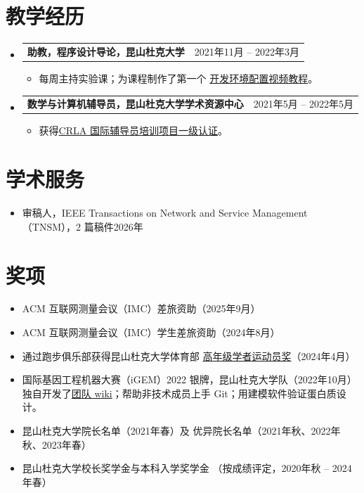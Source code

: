 \documentclass[letterpaper,11pt]{article}
\makeatletter
\newcommand{\CVItem}[1]{
  \item{\small
    {#1}
  }
}
\newcommand{\CVSubheadingFrame}[1]{
  \item
    \begin{tabular*}{0.97\textwidth}[t]{l@{\extracolsep{\fill}}r}
        #1
    \end{tabular*}
}
\newcommand{\CVSubHeadingListStart}{\begin{itemize}[leftmargin=1.2em, label={}]}
\newcommand{\CVSubHeadingListEnd}{\end{itemize}}
\newcommand{\CVItemListStart}{\begin{itemize}}
\newcommand{\CVItemListEnd}{\end{itemize}}
\newcommand{\uhref}[2]{\href{#1}{\textcolor{darkbluepurple}{#2}}}
\makeatother
\begin{document}
\section{教学经历}
\CVSubHeadingListStart
\CVSubheadingFrame
{\textbf{助教，程序设计导论，昆山杜克大学}&
    2021年11月 -- 2022年3月
}
\CVItemListStart
\CVItem
{每周主持实验课；为课程制作了第一个
    \uhref{https://www.youtube.com/watch?v=yiL-ULPBkvE}{开发环境配置视频教程}。
}
\CVItemListEnd

\CVSubheadingFrame
{\textbf{数学与计算机辅导员，昆山杜克大学学术资源中心}&
    2021年5月 -- 2022年5月
}
\CVItemListStart
\CVItem
{获得\uhref
    {https://github.com/SichangHe/curriculum_vitae/files/11665403/CRLA_certificate.pdf}
    {CRLA 国际辅导员培训项目一级认证}。}
\CVItemListEnd
\CVSubHeadingListEnd

\section{学术服务}
\begin{itemize}
    \item 审稿人，IEEE Transactions on Network and Service Management
    （TNSM），2 篇稿件\hfill 2026年
\end{itemize}

\section{奖项}
\begin{itemize}
    \item ACM 互联网测量会议（IMC）差旅资助（2025年9月）
    \item ACM 互联网测量会议（IMC）学生差旅资助（2024年8月）
    \item 通过跑步俱乐部获得昆山杜克大学体育部
    \uhref{https://github.com/SichangHe/curriculum_vitae/files/15110729/scholar_athelete_award_DKU_running_club.pdf}
    {高年级学者运动员奖}（2024年4月）

    \item 国际基因工程机器大赛（iGEM）2022 银牌，昆山杜克大学队（2022年10月）\\{\small
    独自开发了\uhref{https://github.com/SichangHe/igem-2022-dku-backup}
    {团队 wiki}；帮助非技术成员上手 Git；用建模软件验证蛋白质设计。
    }
    \item 昆山杜克大学院长名单（2021年春）及
    优异院长名单（2021年秋、2022年秋、2023年春）
    \item 昆山杜克大学校长奖学金与本科入学奖学金
    （按成绩评定，2020年秋 -- 2024年春）
\end{itemize}
\end{document}
